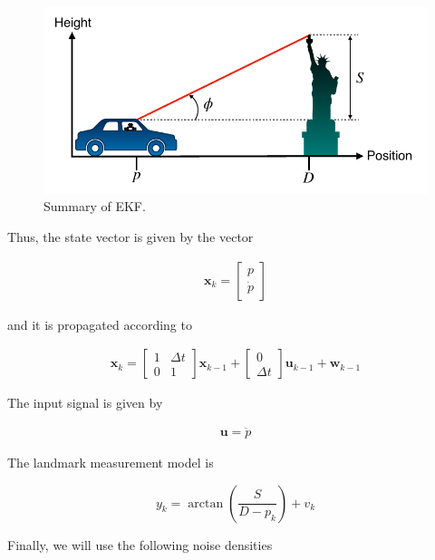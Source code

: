 \begin{figure}[!htb]
\begin{center}
\includegraphics[scale=0.280]{img/kalman_filter/kalman_7.jpeg}
\end{center}
\caption{Summary of EKF.}
\label{kalman_7}
\end{figure}

Thus, the state vector is given by the vector

\begin{eqnarray}
\mathbf{x}_k = 
\begin{bmatrix}
p \\
\dot{p}
\end{bmatrix}
\end{eqnarray}

and it is propagated according to

\begin{eqnarray}
\mathbf{x}_k = 
\begin{bmatrix}
1 & \Delta t \\
0 & 1
\end{bmatrix}
\mathbf{x}_{k-1} + 
\begin{bmatrix}
 0 \\
 \Delta t 
\end{bmatrix}
\mathbf{u}_{k-1} + \mathbf{w}_{k-1}
\end{eqnarray}

The input signal is given by

\begin{eqnarray}
\mathbf{u} = \ddot{p} 
\end{eqnarray}

The landmark measurement model is

\begin{equation}
y_k = \arctan(\frac{S}{D - p_k}) + v_k
\end{equation}

Finally, we will use the following noise densities

